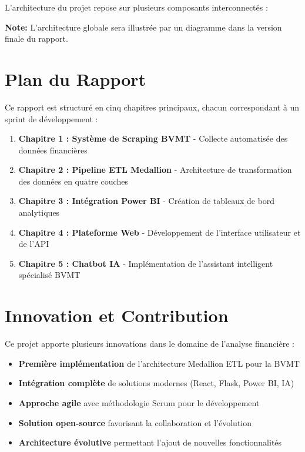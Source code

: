 L'architecture du projet repose sur plusieurs composants interconnectés :


\textbf{Note:} L'architecture globale sera illustrée par un diagramme dans la version finale du rapport.

\section*{Plan du Rapport}

Ce rapport est structuré en cinq chapitres principaux, chacun correspondant à un sprint de développement :

\begin{enumerate}
    \item \textbf{Chapitre 1 : Système de Scraping BVMT} - Collecte automatisée des données financières
    \item \textbf{Chapitre 2 : Pipeline ETL Medallion} - Architecture de transformation des données en quatre couches
    \item \textbf{Chapitre 3 : Intégration Power BI} - Création de tableaux de bord analytiques
    \item \textbf{Chapitre 4 : Plateforme Web} - Développement de l'interface utilisateur et de l'API
    \item \textbf{Chapitre 5 : Chatbot IA} - Implémentation de l'assistant intelligent spécialisé BVMT
\end{enumerate}

\section*{Innovation et Contribution}

Ce projet apporte plusieurs innovations dans le domaine de l'analyse financière :

\begin{itemize}
    \item \textbf{Première implémentation} de l'architecture Medallion ETL pour la BVMT
    \item \textbf{Intégration complète} de solutions modernes (React, Flask, Power BI, IA)
    \item \textbf{Approche agile} avec méthodologie Scrum pour le développement
    \item \textbf{Solution open-source} favorisant la collaboration et l'évolution
    \item \textbf{Architecture évolutive} permettant l'ajout de nouvelles fonctionnalités
\end{itemize}

